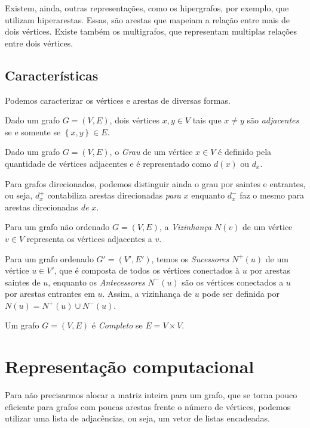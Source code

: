 Existem, ainda, outras representações, como os hipergrafos, por exemplo, que utilizam hiperarestas. Essas, são arestas que mapeiam a relação entre mais de dois vértices. Existe também os multigrafos, que representam multiplas relações entre dois vértices.

\subsection*{Características}

Podemos caracterizar os vértices e arestas de diversas formas.

\begin{definition}
    Dado um grafo $G=\left( V,E \right) $, dois vértices $x,y \in V$ tais que $x\neq y$ são \emph{adjacentes} se e somente se $\left\{ x,y \right\} \in  E$.
\end{definition}

\begin{definition}
    Dado um grafo $G=\left( V,E \right) $, o \emph{Grau} de um vértice $x \in V$ é definido pela quantidade de vértices adjacentes e é representado como $d\left( x \right)$ ou $d_x$.
\end{definition}

Para grafos direcionados, podemos distinguir ainda o grau por saintes e entrantes, ou seja, $d_x^{+}$ contabiliza arestas direcionadas \emph{para} $x$ enquanto $d_x^{-}$ faz o mesmo para arestas direcionadas \emph{de} $x$.

\begin{definition}
    Para um grafo não ordenado $G=\left( V,E \right) $, a \emph{Vizinhança} $N(v)$ de um vértice $v \in V$ representa os vértices adjacentes a $v$.

    Para um grafo ordenado  $G'=\left( V',E' \right) $, temos os \emph{Sucessores} $N^{+}(u)$ de um vértice $u\in V'$, que é composta de todos os vértices conectados à $u$ por arestas saintes de $u$, enquanto os \emph{Antecessores} $N^{-}(u)$ são os vértices conectados a $u$ por arestas entrantes em $u$. Assim, a vizinhança de $u$ pode ser definida por $N(u) = N^{+}(u) \cup N^{-}(u)$.
\end{definition}

\begin{definition}
    Um grafo $G=\left( V,E \right)$ é \emph{Completo} se $E = V\times V$.
\end{definition}

\section*{Representação computacional}

Para não precisarmos alocar a matriz inteira para um grafo, que se torna pouco eficiente para grafos com poucas arestas frente o número de vértices, podemos utilizar uma lista de adjacências, ou seja, um vetor de listas encadeadas.
